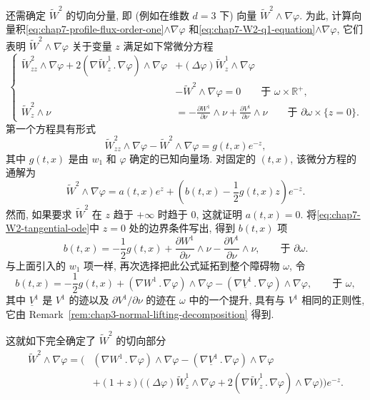 \begin{sloppypar}
还需确定 $\widetilde W^2$ 的切向分量, 即 (例如在维数 $d=3$ 下) 向量 $\widetilde W^2\wedge\nabla\varphi$. 为此, 计算向量积\eqref{eq:chap7-profile-flux-order-one}$\wedge\nabla\varphi$ 和\eqref{eq:chap7-W2-q1-equation}$\wedge\nabla\varphi$, 它们表明 $\widetilde W^2\wedge\nabla\varphi$ 关于变量 $z$ 满足如下常微分方程
\begin{equation}
\left\{
\begin{aligned}
 \widetilde W^2_{zz}\wedge\nabla\varphi
 +2(\nabla\widetilde W^1_z\mathbin{.}\nabla\varphi)\wedge\nabla\varphi
 &+(\Delta\varphi)\widetilde W^1_z\wedge\nabla\varphi\\
 &-\widetilde W^2\wedge\nabla\varphi=0
 \qquad\text{于 }\omega\times\mathbb R^+,\\
 \widetilde W^2_z\wedge\nu&=-\frac{\partial W^1}{\partial\nu}\wedge\nu
 +\frac{\partial V^1}{\partial\nu}\wedge\nu
 \qquad\text{于 }\partial\omega\times\{z=0\}.
\end{aligned}
\right.
\label{eq:chap7-W2-tangential-ode}
\end{equation}
第一个方程具有形式
\[
 \widetilde W^2_{zz}\wedge\nabla\varphi
 -\widetilde W^2\wedge\nabla\varphi=g(t,x)e^{-z},
\]
其中 $g(t,x)$ 是由 $w_1$ 和 $\varphi$ 确定的已知向量场. 对固定的 $(t,x)$, 该微分方程的通解为
\[
 \widetilde W^2\wedge\nabla\varphi
 =a(t,x)e^z+\left(b(t,x)-\frac12g(t,x)z\right)e^{-z}.
\]
然而, 如果要求 $\widetilde W^2$ 在 $z$ 趋于 $+\infty$ 时趋于 $0$, 这就证明 $a(t,x)=0$. 将\eqref{eq:chap7-W2-tangential-ode}中 $z=0$ 处的边界条件写出, 得到 $b(t,x)$ 项
\[
 b(t,x)=-\frac12g(t,x)+\frac{\partial W^1}{\partial\nu}\wedge\nu
 -\frac{\partial V^1}{\partial\nu}\wedge\nu,
 \qquad\text{于 }\partial\omega.
\]
与上面引入的 $w_1$ 项一样, 再次选择把此公式延拓到整个障碍物 $\omega$, 令
\[
 b(t,x)=-\frac12g(t,x)+(\nabla W^1\mathbin{.}\nabla\varphi)\wedge\nabla\varphi
 -(\nabla\underline V^1\mathbin{.}\nabla\varphi)\wedge\nabla\varphi,
 \qquad\text{于 }\omega,
\]
其中 $\underline V^1$ 是 $V^1$ 的迹以及 $\partial V^1/\partial\nu$ 的迹在 $\omega$ 中的一个提升, 具有与 $V^1$ 相同的正则性, 它由 Remark~\ref{rem:chap3-normal-lifting-decomposition} 得到.

这就如下完全确定了 $\widetilde W^2$ 的切向部分
\begin{equation}
\begin{split}
 \widetilde W^2\wedge\nabla\varphi
 =\Big(& (\nabla W^1\mathbin{.}\nabla\varphi)\wedge\nabla\varphi
 -(\nabla\underline V^1\mathbin{.}\nabla\varphi)\wedge\nabla\varphi\\
 &+(1+z)\big((\Delta\varphi)\widetilde W^1_z\wedge\nabla\varphi
 +2(\nabla\widetilde W^1_z\mathbin{.}\nabla\varphi)\wedge\nabla\varphi\big)\Big)e^{-z}.
\end{split}
\label{eq:chap7-W2-tangential-profile}
\end{equation}


\end{sloppypar}
